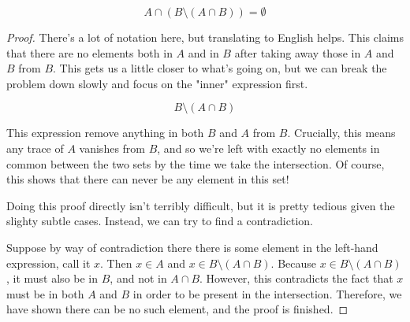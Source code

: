 \documentclass{standalone}
\begin{document}
\begin{theorem}
  \[
    A \cap (B \setminus (A \cap B)) = \emptyset
  \]
\end{theorem}

\begin{proof}
  There's a lot of notation here, but translating to English helps. This claims
  that there are no elements both in $A$ and in $B$ after taking away those in
  $A$ and $B$ from $B$. This gets us a little closer to what's going on, but we
  can break the problem down slowly and focus on the "inner" expression first.

  \[
    B \setminus (A \cap B)
  \]

  This expression remove anything in both $B$ and $A$ from $B$. Crucially, this
  means any trace of $A$ vanishes from $B$, and so we're left with exactly no
  elements in common between the two sets by the time we take the intersection.
  Of course, this shows that there can never be any element in this set!

  Doing this proof directly isn't terribly difficult, but it is pretty tedious
  given the slighty subtle cases. Instead, we can try to find a contradiction.

  Suppose by way of contradiction there there is some element in the left-hand
  expression, call it $x$. Then $x \in A$ and $x \in B \setminus (A \cap B)$.
  Because $x \in B \setminus (A \cap B)$, it must also be in $B$, and not in
  $A \cap B$. However, this contradicts the fact that $x$ must be in both $A$
  and $B$ in order to be present in the intersection. Therefore, we have shown
  there can be no such element, and the proof is finished.
\end{proof}
\end{document}
